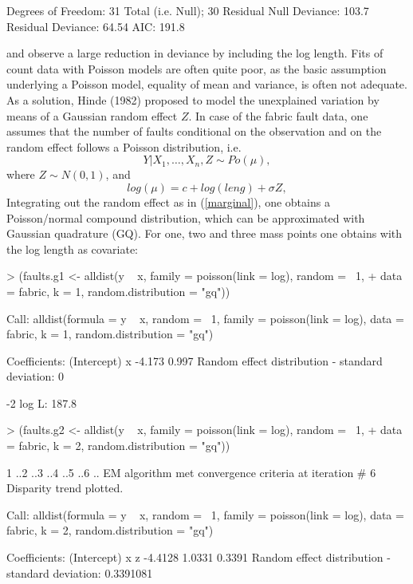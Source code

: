 \documentclass[a4paper]{article}
\begin{document}
\begin{landscape}
\begin{Schunk}
\begin{Soutput}
Degrees of Freedom: 31 Total (i.e. Null);  30 Residual
Null Deviance:	    103.7 
Residual Deviance: 64.54 	AIC: 191.8 
\end{Soutput}
\end{Schunk}
and observe a large reduction in deviance by including the log length.
Fits of count data with Poisson models are often quite poor, as the basic assumption 
underlying a Poisson model, equality of mean and
variance, is often not adequate. 
As a solution, Hinde (1982) proposed to model the unexplained variation by means of a Gaussian random effect $Z$. In case of the fabric fault data,  
one assumes that the number of faults conditional on the observation and on the
random effect follows a Poisson distribution, i.e.
\[
Y|X_1, \ldots, X_n,Z \sim Po(\mu),
\]
where $Z\sim N(0,1)$, and
\[
log(\mu)=c+ log(leng)+\sigma Z,
\]  
 Integrating out the random effect as in (\ref{marginal}), one obtains a Poisson/normal compound distribution, which can
be approximated with Gaussian quadrature (GQ).  For one, two and three mass points one obtains with the log length as covariate: 
\begin{Schunk}
\begin{Sinput}
> (faults.g1 <- alldist(y ~ x, family = poisson(link = log), random = ~1, 
+     data = fabric, k = 1, random.distribution = "gq"))
\end{Sinput}
\begin{Soutput}
Call:  alldist(formula = y ~ x, random = ~1, family = poisson(link = log),      data = fabric, k = 1, random.distribution = "gq") 

Coefficients:
(Intercept)            x  
     -4.173        0.997  
Random effect distribution - standard deviation:	   0 

-2 log L:	    187.8 
\end{Soutput}
\begin{Sinput}
> (faults.g2 <- alldist(y ~ x, family = poisson(link = log), random = ~1, 
+     data = fabric, k = 2, random.distribution = "gq"))
\end{Sinput}
\begin{Soutput}
1 ..2 ..3 ..4 ..5 ..6 ..
EM algorithm met convergence criteria at iteration #  6 
Disparity trend plotted.

Call:  alldist(formula = y ~ x, random = ~1, family = poisson(link = log),      data = fabric, k = 2, random.distribution = "gq") 

Coefficients:
(Intercept)            x            z  
    -4.4128       1.0331       0.3391  
Random effect distribution - standard deviation:	   0.3391081 


\end{Soutput}
\end{Schunk}
\end{landscape}
\end{document}

